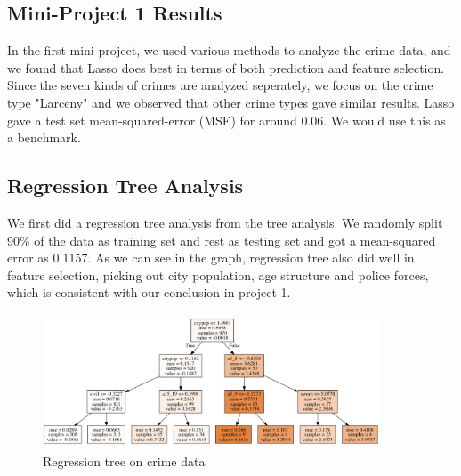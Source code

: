 \documentclass{article}
\begin{document}
\subsection{Mini-Project 1 Results}
In the first mini-project, we used various methods to analyze the crime data, and we found that Lasso does best in terms of both prediction and feature selection. Since the seven kinds of crimes are analyzed seperately, we focus on the crime type "Larceny" and we observed that other crime types gave similar results. Lasso gave a test set mean-squared-error (MSE) for around 0.06. We would use this as a benchmark.

\subsection{Regression Tree Analysis}
\label{crime_reg_tree}
We first did a regression tree analysis from the tree analysis. We randomly split 90\% of the data as training set and rest as testing set and got a mean-squared error as 0.1157. As we can see in the graph, regression tree also did well in feature selection, picking out city population, age structure and police forces, which is consistent with our conclusion in project 1.
\begin{figure}[h]
  \centering
  \includegraphics[width=10cm, height=4cm]{crime_treetu}
  \caption{Regression tree on crime data}
\end{figure}
\end{document}
